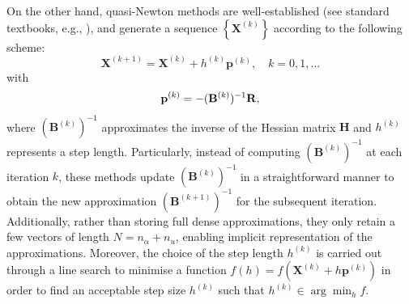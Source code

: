 On the other hand, quasi-Newton methods are well-established (see standard textbooks, e.g., \cite{Nocedal1999-zr,Nocedal2006-qh}), and generate a sequence $\left\{\mathbf{X}^{(k)}\right\}$ according to the following scheme:
\begin{equation}
    \mathbf{X}^{(k+1)} = \mathbf{X}^{(k)} + h^{(k)} \mathbf{p} ^{(k)}, \quad k=0,1,\ldots
\end{equation}
with
\begin{equation}
    \mathbf{p}^{(k)}=-(\mathbf{B}^{(k)})^{-1}{\bf R},
\end{equation}
where $(\mathbf{B}^{(k)})^{-1}$ approximates the inverse of the Hessian matrix  $\mathbf{H}$ and $h^{(k)}$ represents a step length. Particularly, instead of computing $(\mathbf{B}^{(k)})^{-1}$  at each iteration $k$, these methods update $(\mathbf{B}^{(k)})^{-1}$ in a straightforward manner to obtain the new approximation $(\mathbf{B}^{(k+1)})^{-1}$  for the subsequent iteration. Additionally, rather than storing full dense approximations, they only retain a few vectors of length $N=n_\alpha + n_u$, enabling implicit representation of the approximations. Moreover, the choice of the step length $h^{(k)}$ is carried out through a line search to minimise a function $f(h) = f(\mathbf{X}^{(k)} + h \mathbf{p}^{(k)})$ in order to find an acceptable step size $h^{(k)}$ such that $h^{(k)} \in \arg \min_{h} f$.

